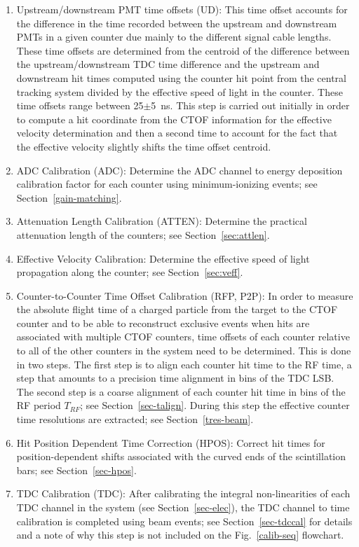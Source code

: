 \documentclass[3p,times,twocolumn]{elsarticle}
\begin{document}
\begin{enumerate}
\item Upstream/downstream PMT time offsets (UD): This time offset accounts for the difference in the
time recorded between the upstream and downstream PMTs in a given counter due mainly to the different
signal cable lengths. These time offsets are determined from the centroid of the difference between the
upstream/downstream TDC time difference and the upstream and downstream hit times computed using the
counter hit point from the central tracking system divided by the effective speed of light in the counter.
These time offsets range between 25$\pm$5~ns. This step is carried out initially in order to compute a hit
coordinate from the CTOF information for the effective velocity determination and then a second time to
account for the fact that the effective velocity slightly shifts the time offset centroid.

\item ADC Calibration (ADC): Determine the ADC channel to energy deposition calibration factor for each
counter using minimum-ionizing events; see Section~\ref{gain-matching}.

\item Attenuation Length Calibration (ATTEN): Determine the practical attenuation length of the counters;
see Section~\ref{sec:attlen}.

\item Effective Velocity Calibration: Determine the effective speed of light propagation along the
counter; see Section~\ref{sec:veff}.

\item Counter-to-Counter Time Offset Calibration (RFP, P2P): In order to measure the absolute flight time
of a charged particle from the target to the CTOF counter and to be able to reconstruct exclusive events
when hits are associated with multiple CTOF counters, time offsets of each counter relative to all of the
other counters in the system need to be determined. This is done in two steps. The first step is to align each
counter hit time to the RF time, a step that amounts to a precision time alignment in bins of the TDC LSB. The
second step is a coarse alignment of each counter hit time in bins of the RF period $T_{RF}$; see
Section~\ref{sec-talign}. During this step the effective counter time resolutions are extracted; see
Section~\ref{tres-beam}.

\item Hit Position Dependent Time Correction (HPOS): Correct hit times for position-dependent shifts
associated with the curved ends of the scintillation bars; see Section~\ref{sec-hpos}.

\item TDC Calibration (TDC): After calibrating the integral non-linearities of each TDC channel in the system
(see Section~\ref{sec-elec}), the TDC channel to time calibration is completed using beam events; see
Section~\ref{sec-tdccal} for details and a note of why this step is not included on the Fig.~\ref{calib-seq}
flowchart.

\end{enumerate}
\end{document}
